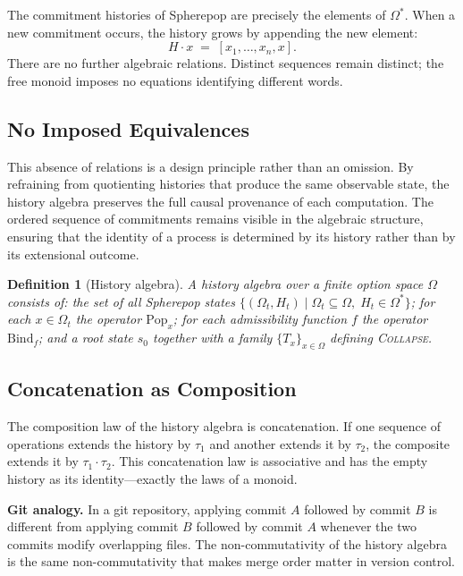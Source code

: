 \documentclass[12pt]{article}
\newtheorem{definition}{Definition}[section]
\begin{document}
The commitment histories of Spherepop are precisely the elements of $\Omega^*$. When a new commitment occurs, the history grows by appending the new element:
\[
H \cdot x \;=\; [x_1, \ldots, x_n, x].
\]
There are no further algebraic relations. Distinct sequences remain distinct; the free monoid imposes no equations identifying different words.

\subsection{No Imposed Equivalences}

This absence of relations is a design principle rather than an omission. By refraining from quotienting histories that produce the same observable state, the history algebra preserves the full causal provenance of each computation. The ordered sequence of commitments remains visible in the algebraic structure, ensuring that the identity of a process is determined by its history rather than by its extensional outcome.

\begin{definition}[History algebra]
\label{def:histalg}
A \emph{history algebra} over a finite option space $\Omega$ consists of: the set of all Spherepop states $\{(\Omega_t, H_t) \mid \Omega_t \subseteq \Omega,\; H_t \in \Omega^*\}$; for each $x \in \Omega_t$ the operator $\mathrm{Pop}_x$; for each admissibility function $f$ the operator $\mathrm{Bind}_f$; and a root state $s_0$ together with a family $\{T_x\}_{x\in\Omega}$ defining \textsc{Collapse}.
\end{definition}

\subsection{Concatenation as Composition}

The composition law of the history algebra is concatenation. If one sequence of operations extends the history by $\tau_1$ and another extends it by $\tau_2$, the composite extends it by $\tau_1 \cdot \tau_2$. This concatenation law is associative and has the empty history as its identity---exactly the laws of a monoid.

\medskip
\noindent \textbf{Git analogy.} In a git repository, applying commit $A$ followed by commit $B$ is different from applying commit $B$ followed by commit $A$ whenever the two commits modify overlapping files. The non-commutativity of the history algebra is the same non-commutativity that makes merge order matter in version control.
\medskip
\end{document}
